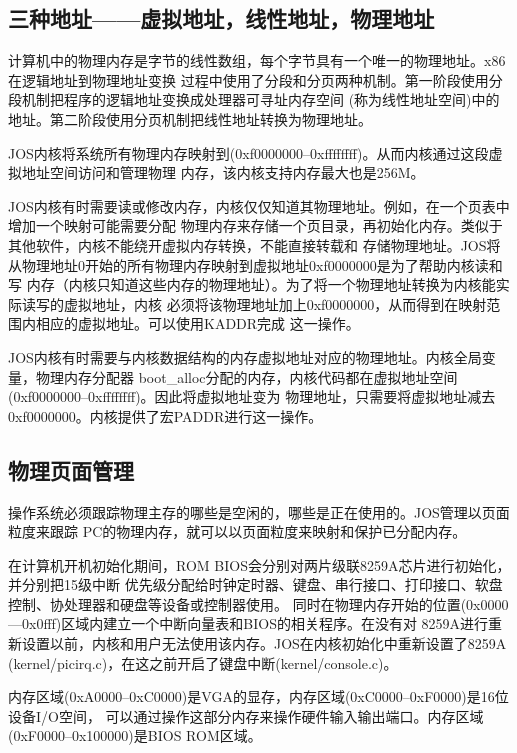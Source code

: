 \documentclass[12pt,openany,a4paper]{report}
\begin{document}
	\subsection{三种地址——虚拟地址，线性地址，物理地址}
	    计算机中的物理内存是字节的线性数组，每个字节具有一个唯一的物理地址。x86在逻辑地址到物理地址变换
	过程中使用了分段和分页两种机制。第一阶段使用分段机制把程序的逻辑地址变换成处理器可寻址内存空间
	(称为线性地址空间)中的地址。第二阶段使用分页机制把线性地址转换为物理地址。\par
	    JOS内核将系统所有物理内存映射到(0xf0000000--0xffffffff)。从而内核通过这段虚拟地址空间访问和管理物理
	内存，该内核支持内存最大也是256M。\par
	    JOS内核有时需要读或修改内存，内核仅仅知道其物理地址。例如，在一个页表中增加一个映射可能需要分配
	物理内存来存储一个页目录，再初始化内存。类似于其他软件，内核不能绕开虚拟内存转换，不能直接转载和
	存储物理地址。JOS将从物理地址0开始的所有物理内存映射到虚拟地址0xf0000000是为了帮助内核读和写
	内存（内核只知道这些内存的物理地址）。为了将一个物理地址转换为内核能实际读写的虚拟地址，内核
	必须将该物理地址加上0xf0000000，从而得到在映射范围内相应的虚拟地址。可以使用KADDR完成
	这一操作。\par
	    JOS内核有时需要与内核数据结构的内存虚拟地址对应的物理地址。内核全局变量，物理内存分配器
	boot\_alloc分配的内存，内核代码都在虚拟地址空间(0xf0000000--0xffffffff)。因此将虚拟地址变为
	物理地址，只需要将虚拟地址减去0xf0000000。内核提供了宏PADDR进行这一操作。\par
	\subsection{物理页面管理}
	    操作系统必须跟踪物理主存的哪些是空闲的，哪些是正在使用的。JOS管理以页面粒度来跟踪
	PC的物理内存，就可以以页面粒度来映射和保护已分配内存。\par
	    在计算机开机初始化期间，ROM BIOS会分别对两片级联8259A芯片进行初始化，并分别把15级中断
	优先级分配给时钟定时器、键盘、串行接口、打印接口、软盘控制、协处理器和硬盘等设备或控制器使用。
	同时在物理内存开始的位置(0x0000---0x0fff)区域内建立一个中断向量表和BIOS的相关程序。在没有对
	8259A进行重新设置以前，内核和用户无法使用该内存。JOS在内核初始化中重新设置了8259A
	(kernel/picirq.c)，在这之前开启了键盘中断(kernel/console.c)。\par
	    内存区域(0xA0000--0xC0000)是VGA的显存，内存区域(0xC0000--0xF0000)是16位设备I/O空间，
	可以通过操作这部分内存来操作硬件输入输出端口。内存区域(0xF0000--0x100000)是BIOS ROM区域。\par
	
\end{document}
